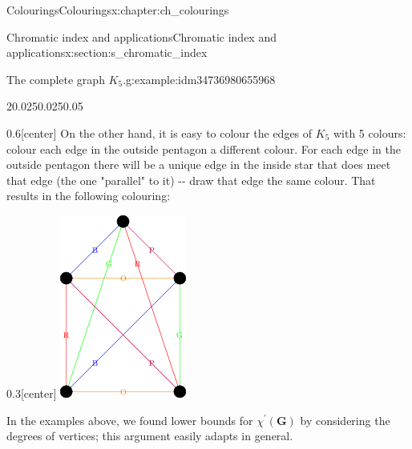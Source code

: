 \documentclass[oneside,10pt,]{book}
\numberwithin{equation}{section}
\newcommand{\bfG}{\mathbf{G}}
\begin{document}
\begin{chapterptx}{Colourings}{}{Colourings}{}{}{x:chapter:ch_colourings}
\begin{sectionptx}{Chromatic index and applications}{}{Chromatic index and applications}{}{}{x:section:s_chromatic_index}
\begin{example}{The complete graph \(K_5\).}{g:example:idm34736980655968}
\begin{sidebyside}{2}{0.025}{0.025}{0.05}%
\begin{sbspanel}{0.6}[center]%
On the other hand, it is easy to colour the edges of \(K_5\) with 5 colours:  colour each edge in the outside pentagon a different colour.  For each edge in the outside pentagon there will be a unique edge in the inside star that does meet that edge (the one "parallel" to it) -{}-{} draw that edge the same colour.  That results in the following colouring:%
\end{sbspanel}%
\begin{sbspanel}{0.3}[center]%
\includegraphics[width=\linewidth]{images/K5EdgeColouring3.png}
\end{sbspanel}%
\end{sidebyside}%
\end{example}
In the examples above, we found lower bounds for \(\chi^\prime(\bfG)\) by considering the degrees of vertices; this argument easily adapts in general.%

\end{sectionptx}
\end{chapterptx}
\end{document}
